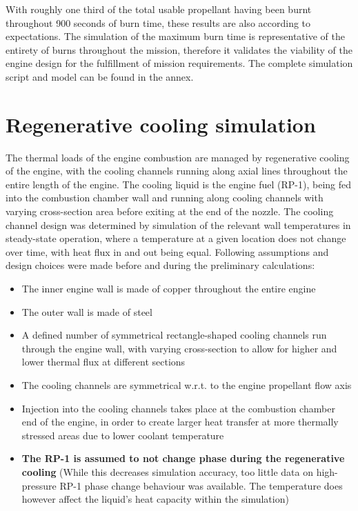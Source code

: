 With roughly one third of the total usable propellant having been burnt throughout 900 seconds of burn time, these results are also according to expectations. The simulation of the maximum burn time is representative of the entirety of burns throughout the mission, therefore it validates the viability of the engine design for the fulfillment of mission requirements. The complete simulation script and model can be found in the annex. \pagebreak 
\section{Regenerative cooling simulation}

\qquad The thermal loads of the engine combustion are managed by regenerative cooling of the engine, with the cooling channels running along axial lines throughout the entire length of the engine. The cooling liquid is the engine fuel (RP-1), being fed into the combustion chamber wall and running along cooling channels with varying cross-section area before exiting at the end of the nozzle. The cooling channel design was determined by simulation of the relevant wall temperatures in steady-state operation, where a temperature at a given location does not change over time, with heat flux in and out being equal. Following assumptions and design choices were made before and during the preliminary calculations:
\begin{itemize}
	\itemsep0em 
	\item	The inner engine wall is made of copper throughout the entire engine
	\item	The outer wall is made of steel
	\item	A defined number of symmetrical rectangle-shaped cooling channels run through the engine wall, with varying cross-section to allow for higher and lower thermal flux at different sections
	\item	The cooling channels are symmetrical w.r.t. to the engine propellant flow axis
	\item	Injection into the cooling channels takes place at the combustion chamber end of the engine, in order to create larger heat transfer at more thermally stressed areas due to lower coolant temperature
	\item	\textbf{The RP-1 is assumed to not change phase during the regenerative cooling} (While this decreases simulation accuracy, too little data on high-pressure RP-1 phase change behaviour was available. The temperature does however affect the liquid’s heat capacity within the simulation)
\end{itemize}

